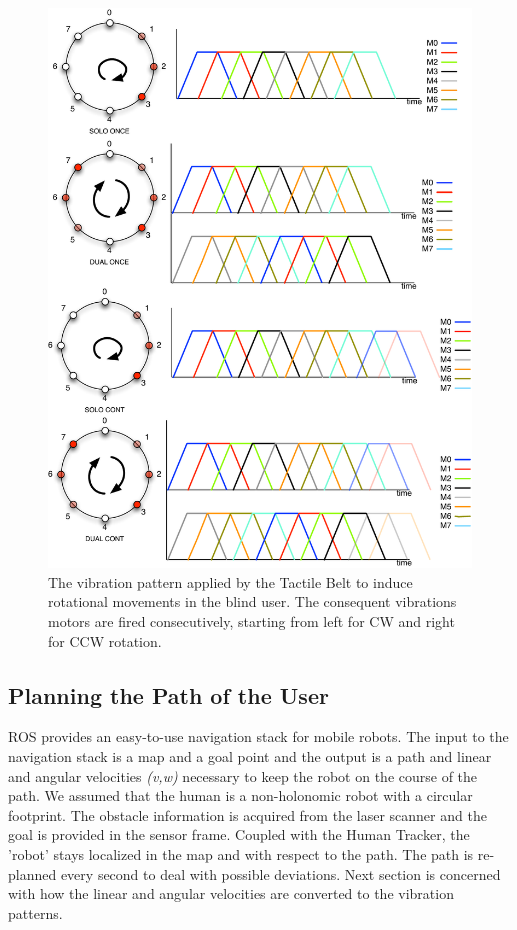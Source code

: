 \begin{figure}[ht!]
\centering
\includegraphics[width=1.0\textwidth]{pics/vibration_pattern_solo_cont}
\caption{The vibration pattern applied by the Tactile Belt to induce rotational movements in the blind user. The consequent vibrations motors are fired consecutively, starting from left for CW and right for CCW rotation.}
\label{fig:vibration_pattern_solo_cont}
\end{figure}


\subsection{Planning the Path of the User}

ROS provides an easy-to-use navigation stack for mobile robots. The input to the navigation stack is a map and a goal point and the output is a path and linear and angular velocities \emph{(v,w)} necessary to keep the robot on the course of the path. We assumed that the human is a non-holonomic robot with a circular footprint. The obstacle information is acquired from the laser scanner and the goal is provided in the sensor frame. Coupled with the Human Tracker, the 'robot' stays localized in the map and with respect to the path. The path is re-planned every second to deal with possible deviations. Next section is concerned with how the linear and angular velocities are converted to the vibration patterns.

